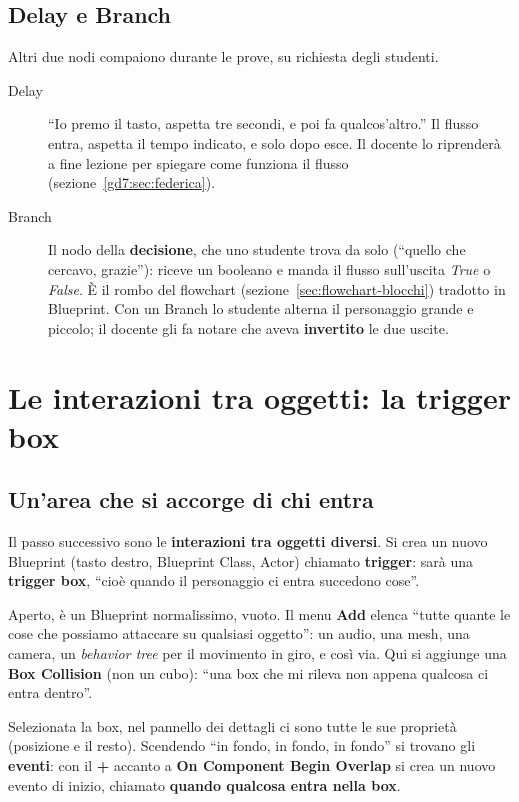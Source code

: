 \subsection{Delay e Branch}

Altri due nodi compaiono durante le prove, su richiesta degli studenti.
\begin{description}
  \item[Delay] ``Io premo il tasto, aspetta tre secondi, e poi fa
        qualcos'altro.'' Il flusso entra, aspetta il tempo indicato, e solo
        dopo esce. Il docente lo riprenderà a fine lezione per spiegare come
        funziona il flusso (sezione~\ref{gd7:sec:federica}).
  \item[Branch] Il nodo della \textbf{decisione}, che uno studente trova da
        solo (``quello che cercavo, grazie''): riceve un booleano e manda il
        flusso sull'uscita \emph{True} o \emph{False}. È il rombo del
        flowchart (sezione~\ref{sec:flowchart-blocchi}) tradotto in
        Blueprint. Con un Branch lo studente alterna il personaggio grande e
        piccolo; il docente gli fa notare che aveva \textbf{invertito} le due
        uscite.
\end{description}

\section{Le interazioni tra oggetti: la trigger box}
\label{gd7:sec:trigger}

\subsection{Un'area che si accorge di chi entra}

Il passo successivo sono le \textbf{interazioni tra oggetti diversi}. Si crea
un nuovo Blueprint (tasto destro, Blueprint Class, Actor) chiamato
\textbf{trigger}: sarà una \textbf{trigger box}, ``cioè quando il personaggio
ci entra succedono cose''.

Aperto, è un Blueprint normalissimo, vuoto. Il menu \textbf{Add} elenca
``tutte quante le cose che possiamo attaccare su qualsiasi oggetto'': un
audio, una mesh, una camera, un \emph{behavior tree} per il movimento in giro,
e così via. Qui si aggiunge una \textbf{Box Collision} (non un cubo): ``una
box che mi rileva non appena qualcosa ci entra dentro''.

Selezionata la box, nel pannello dei dettagli ci sono tutte le sue proprietà
(posizione e il resto). Scendendo ``in fondo, in fondo, in fondo'' si trovano
gli \textbf{eventi}: con il \textbf{+} accanto a \textbf{On Component Begin
Overlap} si crea un nuovo evento di inizio, chiamato \textbf{quando qualcosa
entra nella box}.

